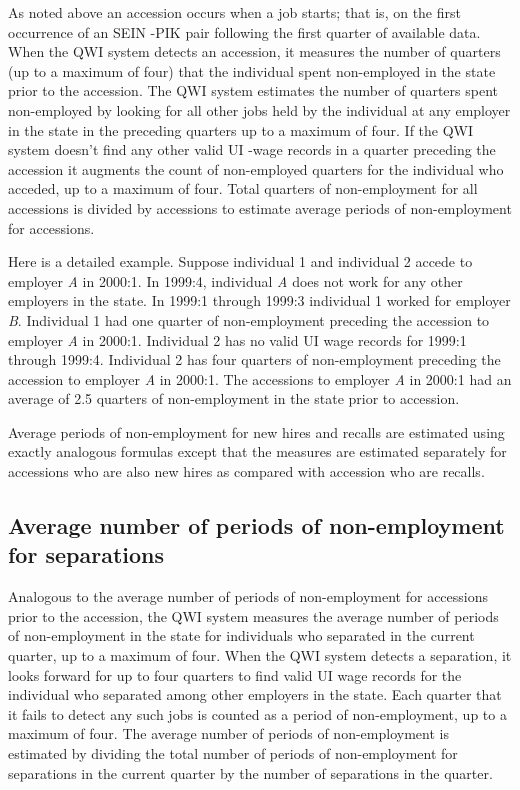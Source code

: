 
As noted above an accession occurs when a job starts; that is, on the first
occurrence of an SEIN%
-PIK%
 pair following the first quarter of available data. When the QWI
system detects an accession, it measures the number of quarters (up to a
maximum of four) that the individual spent non-employed in the state prior
to the accession. The QWI system estimates the number of quarters spent
non-employed by looking for all other jobs held by the individual at any
employer in the state in the preceding quarters up to a maximum of four. If
the QWI system doesn't find any other valid UI%
-wage records in a quarter preceding the accession it augments the
count of non-employed quarters for the individual who acceded, up to a
maximum of four. Total quarters of non-employment for all accessions is
divided by accessions to estimate average periods of non-employment for
accessions.

Here is a detailed example. Suppose individual 1 and individual 2 accede to
employer \textit{A} in 2000:1. In 1999:4, individual \textit{A} does not
work for any other employers in the state. In 1999:1 through 1999:3
individual 1 worked for employer \textit{B}. Individual 1 had one quarter of
non-employment preceding the accession to employer \textit{A} in 2000:1.
Individual 2 has no valid {UI} wage records for 1999:1 through 1999:4.
Individual 2 has four quarters of non-employment preceding the accession to
employer \textit{A} in 2000:1. The accessions to employer \textit{A} in
2000:1 had an average of 2.5 quarters of non-employment in the state prior
to accession.

Average periods of non-employment for new hires and recalls are estimated
using exactly analogous formulas except that the measures are estimated
separately for accessions who are also new hires as compared with accession
who are recalls.

\subsection{Average number of periods of non-employment for separations}


Analogous to the average number of periods of non-employment for accessions
prior to the accession, the QWI system measures the average number of
periods of non-employment in the state for individuals who separated in the
current quarter, up to a maximum of four. When the QWI system detects a
separation, it looks forward for up to four quarters to find valid UI%
 wage records for the individual who separated among other
employers in the state. Each quarter that it fails to detect any such jobs
is counted as a period of non-employment, up to a maximum of four. The
average number of periods of non-employment is estimated by dividing the
total number of periods of non-employment for separations in the current
quarter by the number of separations in the quarter.

